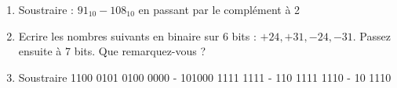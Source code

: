 \documentclass[a4paper,11pt]{article}
\begin{document}
\begin{enumerate}
%

\item {Soustraire : $91_{10}-108_{10}$ en passant par le complément à 2}

%
%

\item {Ecrire les nombres suivants en binaire sur 6 bits : $+24,+31,-24,-31$. Passez ensuite à 7 bits. Que remarquez-vous ?}

%
%

\item {Soustraire 1100 0101 0100 0000 - 101000 1111 1111 - 110 1111 1110 - 10 1110}



\end{enumerate}
\end{document}

